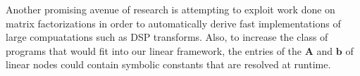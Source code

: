 Another promising avenue of research is attempting to exploit work
done on matrix factorizations in order to automatically derive fast
implementations of large compuatations such as DSP transforms.  Also,
to increase the class of programs that would fit into our linear
framework, the entries of the ${\mathbf A}$ and ${\mathbf b}$ of
linear nodes could contain symbolic constants that are resolved at
runtime.


